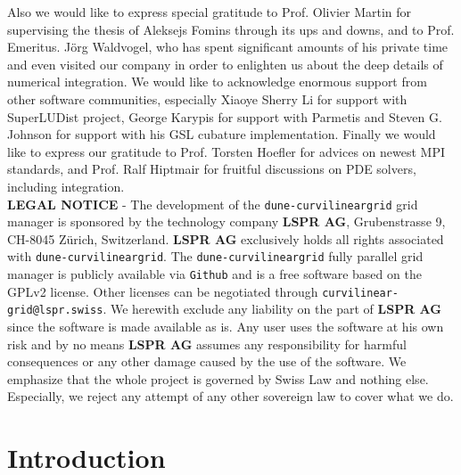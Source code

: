 \documentclass[a4paper,11pt]{article}
\newcommand{\curvgrid}{\setlength\emergencystretch{3cm}\texttt{dune-curvilineargrid}}
\begin{document}
\noindent
Also we would like to express special gratitude to Prof. Olivier Martin for supervising the thesis of Aleksejs Fomins through its ups and downs, and to Prof. Emeritus. J\"org Waldvogel, who has spent significant amounts of his private time and even visited our company in order to enlighten us about the deep details of numerical integration. We would like to acknowledge enormous support from other software communities, especially Xiaoye Sherry Li for support with SuperLUDist project, George Karypis for support with Parmetis and Steven G. Johnson for support with his GSL cubature implementation. Finally we would like to express our gratitude to Prof. Torsten Hoefler for advices on newest MPI standards, and Prof. Ralf Hiptmair for fruitful discussions on PDE solvers, including integration. \\





\vspace{5mm}
{\small
\noindent \textbf{LEGAL NOTICE} - The development of the \curvgrid{} grid manager is sponsored by the technology company \textbf{LSPR AG}, Grubenstrasse 9, CH-8045 Z\"urich, Switzerland. \textbf{LSPR AG} exclusively holds all rights associated with \curvgrid{}.
The \curvgrid{} fully parallel grid manager is publicly available via \texttt{Github} and is a free software based on the GPLv2 license. Other licenses can be negotiated through \texttt{curvilinear-grid@lspr.swiss}.
We herewith exclude any liability on the part of \textbf{LSPR AG} since the software is made available as is. Any user uses the software at his own risk and by no means \textbf{LSPR AG} assumes any responsibility for harmful consequences or any other damage caused by the use of the software. We emphasize that the whole project is governed by Swiss Law and nothing else. Especially, we reject any attempt of any other sovereign law to cover what we do.
}


\tableofcontents


\newpage
\section{Introduction}
\end{document}
